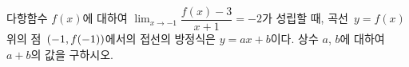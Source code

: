 다항함수 $f(x)$에 대하여 $\displaystyle\lim_{x\to -1}\dfrac{f(x)-3}{x+1}=-2$가 성립할 때, 곡선~$y=f(x)$ 위의 점~$(-1{,}\mkern3mu\mathopen{}f(-1))$에서의 접선의 방정식은 $y=ax+b$이다. 상수 $a$, $b$에 대하여 $a+b$의 값을 구하시오.
